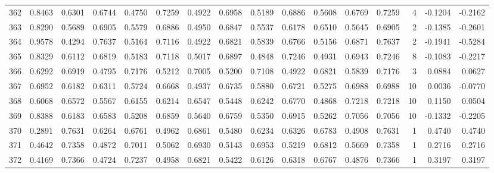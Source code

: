 \begin{tabular}{lrrrrrrrrrrrrrrr}
362 &      0.8463 &  0.6301 &  0.6744 &  0.4750 &  0.7259 &  0.4922 &  0.6958 &  0.5189 &  0.6886 &  0.5608 &   0.6769 &     0.7259 &      4 &                   -0.1204 &                    -0.2162 \\
363 &      0.8290 &  0.5689 &  0.6905 &  0.5579 &  0.6886 &  0.4950 &  0.6847 &  0.5537 &  0.6178 &  0.6510 &   0.5645 &     0.6905 &      2 &                   -0.1385 &                    -0.2601 \\
364 &      0.9578 &  0.4294 &  0.7637 &  0.5164 &  0.7116 &  0.4922 &  0.6821 &  0.5839 &  0.6766 &  0.5156 &   0.6871 &     0.7637 &      2 &                   -0.1941 &                    -0.5284 \\
365 &      0.8329 &  0.6112 &  0.6819 &  0.5183 &  0.7118 &  0.5017 &  0.6897 &  0.4848 &  0.7246 &  0.4931 &   0.6943 &     0.7246 &      8 &                   -0.1083 &                    -0.2217 \\
366 &      0.6292 &  0.6919 &  0.4795 &  0.7176 &  0.5212 &  0.7005 &  0.5200 &  0.7108 &  0.4922 &  0.6821 &   0.5839 &     0.7176 &      3 &                    0.0884 &                     0.0627 \\
367 &      0.6952 &  0.6182 &  0.6311 &  0.5724 &  0.6668 &  0.4937 &  0.6735 &  0.5880 &  0.6721 &  0.5275 &   0.6988 &     0.6988 &     10 &                    0.0036 &                    -0.0770 \\
368 &      0.6068 &  0.6572 &  0.5567 &  0.6155 &  0.6214 &  0.6547 &  0.5448 &  0.6242 &  0.6770 &  0.4868 &   0.7218 &     0.7218 &     10 &                    0.1150 &                     0.0504 \\
369 &      0.8388 &  0.6183 &  0.6583 &  0.5208 &  0.6859 &  0.5640 &  0.6759 &  0.5350 &  0.6915 &  0.5262 &   0.7056 &     0.7056 &     10 &                   -0.1332 &                    -0.2205 \\
370 &      0.2891 &  0.7631 &  0.6264 &  0.6761 &  0.4962 &  0.6861 &  0.5480 &  0.6234 &  0.6326 &  0.6783 &   0.4908 &     0.7631 &      1 &                    0.4740 &                     0.4740 \\
371 &      0.4642 &  0.7358 &  0.4872 &  0.7011 &  0.5062 &  0.6930 &  0.5143 &  0.6953 &  0.5219 &  0.6812 &   0.5669 &     0.7358 &      1 &                    0.2716 &                     0.2716 \\
372 &      0.4169 &  0.7366 &  0.4724 &  0.7237 &  0.4958 &  0.6821 &  0.5422 &  0.6126 &  0.6318 &  0.6767 &   0.4876 &     0.7366 &      1 &                    0.3197 &                     0.3197 \\

\end{tabular}
